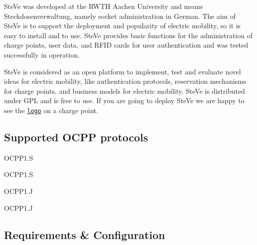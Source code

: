 Ste\-Ve was developed at the R\-W\-T\-H Aachen University and means Steckdosenverwaltung, namely socket administration in German. The aim of Ste\-Ve is to support the deployment and popularity of electric mobility, so it is easy to install and to use. Ste\-Ve provides basic functions for the administration of charge points, user data, and R\-F\-I\-D cards for user authentication and was tested successfully in operation.

Ste\-Ve is considered as an open platform to implement, test and evaluate novel ideas for electric mobility, like authentication protocols, reservation mechanisms for charge points, and business models for electric mobility. Ste\-Ve is distributed under G\-P\-L and is free to use. If you are going to deploy Ste\-Ve we are happy to see the \href{website/logo/managed-by-steve.pdf}{\tt logo} on a charge point.

\subsection*{Supported O\-C\-P\-P protocols }


\begin{DoxyItemize}
\item O\-C\-P\-P1.\-S
\item O\-C\-P\-P1.\-S
\item O\-C\-P\-P1.\-J
\item O\-C\-P\-P1.\-J
\end{DoxyItemize}

\subsection*{Requirements \& Configuration }


